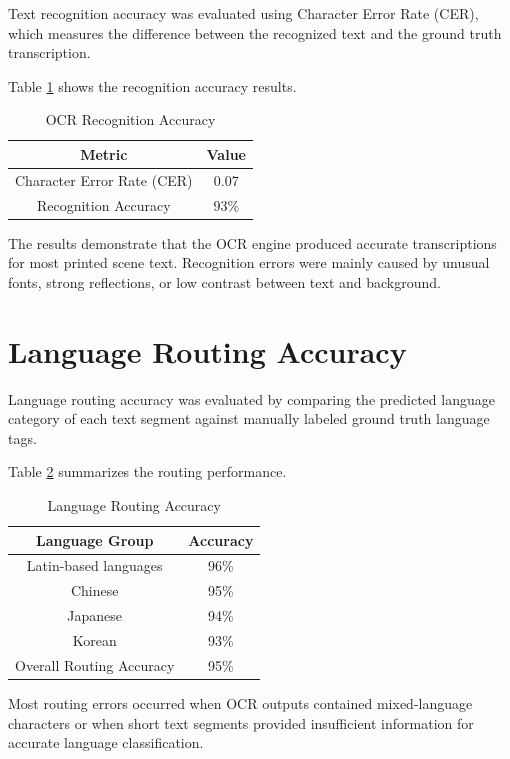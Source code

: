 Text recognition accuracy was evaluated using Character Error Rate (CER), which measures the difference between the recognized text and the ground truth transcription.

Table \ref{tab:ocr_recognition} shows the recognition accuracy results.

\begin{table}[h]
\centering
\caption{OCR Recognition Accuracy}
\label{tab:ocr_recognition}
\begin{tabular}{|c|c|}
\hline
Metric & Value \\
\hline
Character Error Rate (CER) & 0.07 \\
Recognition Accuracy & 93\% \\
\hline
\end{tabular}
\end{table}

The results demonstrate that the OCR engine produced accurate transcriptions for most printed scene text. Recognition errors were mainly caused by unusual fonts, strong reflections, or low contrast between text and background.

\section{Language Routing Accuracy}

Language routing accuracy was evaluated by comparing the predicted language category of each text segment against manually labeled ground truth language tags.

Table \ref{tab:routing_accuracy} summarizes the routing performance.

\begin{table}[h]
\centering
\caption{Language Routing Accuracy}
\label{tab:routing_accuracy}
\begin{tabular}{|c|c|}
\hline
Language Group & Accuracy \\
\hline
Latin-based languages & 96\% \\
Chinese & 95\% \\
Japanese & 94\% \\
Korean & 93\% \\
\hline
Overall Routing Accuracy & 95\% \\
\hline
\end{tabular}
\end{table}

Most routing errors occurred when OCR outputs contained mixed-language characters or when short text segments provided insufficient information for accurate language classification.

